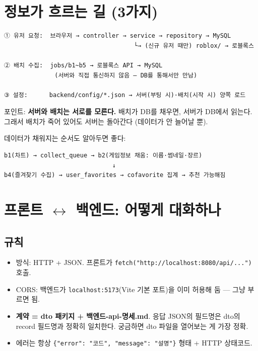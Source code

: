 \documentclass[11pt]{article}
\begin{document}
\section{정보가 흐르는 길 (3가지)}

\begin{Verbatim}[frame=single, fontsize=\small]
① 유저 요청:  브라우저 → controller → service → repository → MySQL
                                    └→ (신규 유저 때만) roblox/ → 로블록스

② 배치 수집:  jobs/b1~b5 → 로블록스 API → MySQL
              (서버와 직접 통신하지 않음 — DB를 통해서만 만남)

③ 설정:      backend/config/*.json → 서버(부팅 시)·배치(시작 시) 양쪽 로드
\end{Verbatim}

포인트: \textbf{서버와 배치는 서로를 모른다.} 배치가 DB를 채우면, 서버가 DB에서 읽는다.
그래서 배치가 죽어 있어도 서버는 돌아간다 (데이터가 안 늘어날 뿐).

데이터가 채워지는 순서도 알아두면 좋다:
\begin{Verbatim}[frame=single, fontsize=\small]
b1(차트) → collect_queue → b2(게임정보 채움: 이름·썸네일·장르)
                              ↓
b4(즐겨찾기 수집) → user_favorites → cofavorite 집계 → 추천 가능해짐
\end{Verbatim}

\section{프론트 $\leftrightarrow$ 백엔드: 어떻게 대화하나}

\subsection{규칙}
\begin{itemize}
  \item 방식: HTTP + JSON. 프론트가 \texttt{fetch("http://localhost:8080/api/...")} 호출.
  \item CORS: 백엔드가 \texttt{localhost:5173}(Vite 기본 포트)을 이미 허용해 둠 --- 그냥 부르면 됨.
  \item \textbf{계약 = dto 패키지 + 백엔드-api-명세.md}. 응답 JSON의 필드명은 dto의 record
        필드명과 정확히 일치한다. 궁금하면 dto 파일을 열어보는 게 가장 정확.
  \item 에러는 항상 \texttt{\{"error": "코드", "message": "설명"\}} 형태 + HTTP 상태코드.
\end{itemize}
\end{document}
